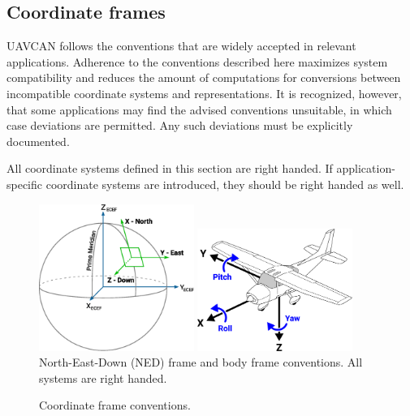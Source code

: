 \subsection{Coordinate frames}

UAVCAN follows the conventions that are widely accepted in relevant applications.
Adherence to the conventions described here maximizes system compatibility and reduces the amount of
computations for conversions between incompatible coordinate systems and representations.
It is recognized, however, that some applications may find the advised conventions unsuitable,
in which case deviations are permitted.
Any such deviations must be explicitly documented.

All coordinate systems defined in this section are right handed.
If application-specific coordinate systems are introduced, they should be right handed as well.

\begin{figure}[hbt]
    \centering
	\includegraphics[width=0.45\textwidth]{application_layer/NED_ECEF}
    \includegraphics[width=0.45\textwidth]{application_layer/aircraft_principal_axes}
    North-East-Down (NED) frame and body frame conventions. All systems are right handed.
    \caption{
        Coordinate frame conventions.
        \label{fig:application_coordinate_frame_conventions}
    }
\end{figure}

